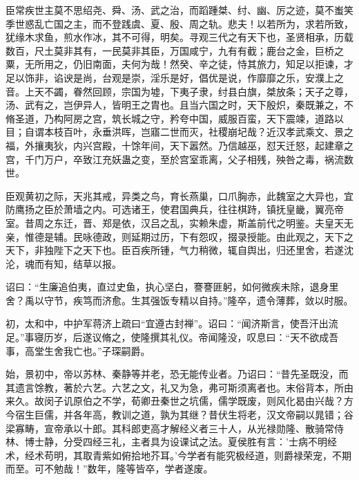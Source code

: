 \documentclass[12pt,UTF8]{ctexbook}
\begin{document}
臣常疾世主莫不思绍尧、舜、汤、武之治，而蹈踵桀、纣、幽、厉之迹，莫不蚩笑季世惑乱亡国之主，而不登践虞、夏、殷、周之轨。悲夫！以若所为，求若所致，犹缘木求鱼，煎水作冰，其不可得，明矣。寻观三代之有天下也，圣贤相承，历载数百，尺土莫非其有，一民莫非其臣，万国咸宁，九有有截；鹿台之金，巨桥之粟，无所用之，仍旧南面，夫何为哉！然癸、辛之徒，恃其旅力，知足以拒谏，才足以饰非，谄谀是尚，台观是崇，淫乐是好，倡优是说，作靡靡之乐，安濮上之音。上天不蠲，眷然回顾，宗国为墟，下夷子隶，纣县白旗，桀放条；天子之尊，汤、武有之，岂伊异人，皆明王之胄也。且当六国之时，天下殷炽，秦既兼之，不脩圣道，乃构阿房之宫，筑长城之守，矜夸中国，威服百蛮，天下震竦，道路以目；自谓本枝百叶，永垂洪晖，岂寤二世而灭，社稷崩圮哉？近汉孝武乘文、景之福，外攘夷狄，内兴宫殿，十馀年间，天下嚣然。乃信越巫，怼天迁怒，起建章之宫，千门万户，卒致江充妖蛊之变，至於宫室乖离，父子相残，殃咎之毒，祸流数世。

臣观黄初之际，天兆其戒，异类之鸟，育长燕巢，口爪胸赤，此魏室之大异也，宜防鹰扬之臣於萧墙之内。可选诸王，使君国典兵，往往棋跱，镇抚皇畿，翼亮帝室。昔周之东迁，晋、郑是依，汉吕之乱，实赖朱虚，斯盖前代之明鉴。夫皇天无亲，惟德是辅。民咏德政，则延期过历，下有怨叹，掇录授能。由此观之，天下之天下，非独陛下之天下也。臣百疾所锺，气力稍微，辄自舆出，归还里舍，若遂沈沦，魂而有知，结草以报。

诏曰：“生廉追伯夷，直过史鱼，执心坚白，謇謇匪躬，如何微疾未除，退身里舍？禹以守节，疾笃而济愈。生其强饭专精以自持。”隆卒，遗令薄葬，敛以时服。

初，太和中，中护军蒋济上疏曰“宜遵古封禅”。诏曰：“闻济斯言，使吾汗出流足。”事寝历岁，后遂议脩之，使隆撰其礼仪。帝闻隆没，叹息曰：“天不欲成吾事，高堂生舍我亡也。”子琛嗣爵。

始，景初中，帝以苏林、秦静等并老，恐无能传业者。乃诏曰：“昔先圣既没，而其遗言馀教，著於六艺。六艺之文，礼又为急，弗可斯须离者也。末俗背本，所由来久。故闵子讥原伯之不学，荀卿丑秦世之坑儒，儒学既废，则风化曷由兴哉？方今宿生巨儒，并各年高，教训之道，孰为其继？昔伏生将老，汉文帝嗣以晁错；谷梁寡畴，宣帝承以十郎。其科郎吏高才解经义者三十人，从光禄勋隆、散骑常侍林、博士静，分受四经三礼，主者具为设课试之法。夏侯胜有言：'士病不明经术，经术苟明，其取青紫如俯拾地芥耳。'今学者有能究极经道，则爵禄荣宠，不期而至。可不勉哉！”数年，隆等皆卒，学者遂废。
\end{document}
